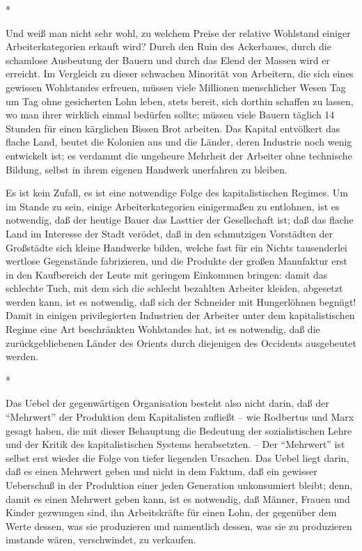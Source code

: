 \documentclass{scrbook}
\begin{document}
\begin{center}*\end{center}

Und weiß man nicht sehr wohl, zu welchem Preise der relative Wohlstand einiger Arbeiterkategorien erkauft wird? Durch den Ruin des Ackerbaues, durch die schamlose Ausbeutung der Bauern und durch das Elend der Massen wird er erreicht. Im Vergleich zu dieser schwachen Minorität von Arbeitern, die sich eines gewissen Wohlstandes erfreuen, müssen viele Millionen menschlicher Wesen Tag um Tag ohne gesicherten Lohn leben, stets bereit, sich dorthin schaffen zu lassen, wo man ihrer wirklich einmal bedürfen sollte; müssen viele Bauern täglich 14 Stunden für einen kärglichen Bissen Brot arbeiten. Das Kapital entvölkert das flache Land, beutet die Kolonien aus und die Länder, deren Industrie noch wenig entwickelt ist; es verdammt die ungeheure Mehrheit der Arbeiter ohne technische Bildung, selbst in ihrem eigenen Handwerk unerfahren zu bleiben.

Es ist kein Zufall, es ist eine notwendige Folge des kapitalistischen Regimes. Um im Stande zu sein, einige Arbeiterkategorien einigermaßen zu entlohnen, ist es notwendig, daß der heutige Bauer das Lasttier der Gesellschaft ist; daß das flache Land im Interesse der Stadt verödet, daß in den schmutzigen Vorstädten der Großstädte sich kleine Handwerke bilden, welche fast für ein Nichts tausenderlei wertlose Gegenstände fabrizieren, und die Produkte der großen Manufaktur erst in den Kaufbereich der Leute mit geringem Einkommen bringen: damit das schlechte Tuch, mit dem sich die schlecht bezahlten Arbeiter kleiden, abgesetzt werden kann, ist es notwendig, daß sich der Schneider mit Hungerlöhnen begnügt! Damit in einigen privilegierten Industrien der Arbeiter unter dem kapitalistischen Regime eine Art beschränkten Wohlstandes hat, ist es notwendig, daß die zurückgebliebenen Länder des Orients durch diejenigen des Occidents ausgebeutet werden.

\begin{center}*\end{center}

Das Uebel der gegenwärtigen Organisation besteht also nicht darin, daß der ``Mehrwert'' der Produktion dem Kapitalisten zufließt – wie Rodbertus und Marx gesagt haben, die mit dieser Behauptung die Bedeutung der sozialistischen Lehre und der Kritik des kapitalistischen Systems herabsetzten. – Der ``Mehrwert'' ist selbst erst wieder die Folge von tiefer liegenden Ursachen. Das Uebel liegt darin, daß es einen Mehrwert geben  und nicht in dem Faktum, daß ein gewisser Ueberschuß in der Produktion einer jeden Generation unkonsumiert bleibt; denn, damit es einen Mehrwert geben kann, ist es notwendig, daß Männer, Frauen und Kinder gezwungen sind, ihn Arbeitskräfte für einen Lohn, der gegenüber dem Werte dessen, was sie produzieren und namentlich dessen, was sie zu produzieren imstande wären, verschwindet, zu verkaufen.
\end{document}
